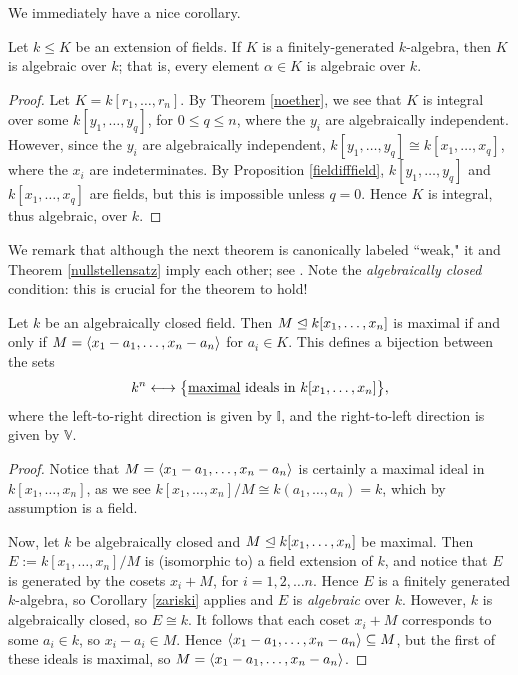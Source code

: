 \documentclass{article}
\newcommand{\V}{\mathbb V}
\newcommand{\I}{\mathbb I}
\begin{document}
We immediately have a nice corollary.
\begin{corollary}\label{zariski}

Let $k\leq K$ be an extension of fields. If $K$ is a finitely-generated $k$-algebra, then $K$ is algebraic over $k$; that is, every element $\alpha\in K$ is algebraic over $k$.
\end{corollary}
\begin{proof}
Let $K = k[r_1,\ldots, r_n]$. By Theorem \ref{noether}, we see that $K$ is integral over some $k[y_1,\ldots, y_q]$, for $0\leq q\leq n$, where the $y_i$ are algebraically independent. However, since the $y_i$ are algebraically independent, $k[y_1,\ldots, y_q]\cong k[x_1, \ldots, x_q]$, where the $x_i$ are indeterminates. By Proposition \ref{fieldifffield}, $k[y_1,\ldots, y_q]$ and $k[x_1,\ldots, x_q]$ are fields, but this is impossible unless $q=0$. Hence $K$ is integral, thus algebraic, over $k$.
\end{proof}

We remark that although the next theorem is canonically labeled ``weak," it and Theorem \ref{nullstellensatz} imply each other; see \cite{smith}. Note the \textit{algebraically closed} condition: this is crucial for the theorem to hold!

\begin{theorem}\label{weak}
Let $k$ be an algebraically closed field. Then $M\trianglelefteq k[x_1, \ldots, x_n]$ is maximal if and only if $M = \left\langle x_1 - a_1, \ldots, x_n-a_n\right\rangle$ for $a_i\in K$. This defines a bijection between the sets
$$k^n \longleftrightarrow \big\{\textrm{\underline{maximal} ideals in } k[x_1,\ldots, x_n]\big\},$$
where the left-to-right direction is given by $\I$, and the right-to-left direction is given by $\V$.
\end{theorem}
\begin{proof}
Notice that $M = \left\langle x_1-a_1, \ldots, x_n-a_n\right\rangle$ is certainly a maximal ideal in $k[x_1,\ldots, x_n]$, as we see $k[x_1,\ldots, x_n]/M \cong k(a_1,\ldots, a_n) = k$, which by assumption is a field.

Now, let $k$ be algebraically closed and $M\trianglelefteq k[x_1, \ldots, x_n]$ be maximal. Then $E := k[x_1,\ldots, x_n]/M$ is (isomorphic to) a field extension of $k$, and notice that $E$ is generated by the cosets $x_i + M$, for $i = 1, 2, \ldots n$. Hence $E$ is a finitely generated $k$-algebra, so Corollary \ref{zariski} applies and $E$ is \textit{algebraic} over $k$. However, $k$ is algebraically closed, so $E \cong k$. It follows that each coset $x_i + M$ corresponds to some $a_i\in k$, so $x_i-a_i \in M$. Hence $\left\langle x_1-a_1, \ldots, x_n-a_n\right\rangle \subseteq M$, but the first of these ideals is maximal, so $M = \left\langle x_1-a_1, \ldots, x_n-a_n\right\rangle$.
\end{proof}
\end{document}
